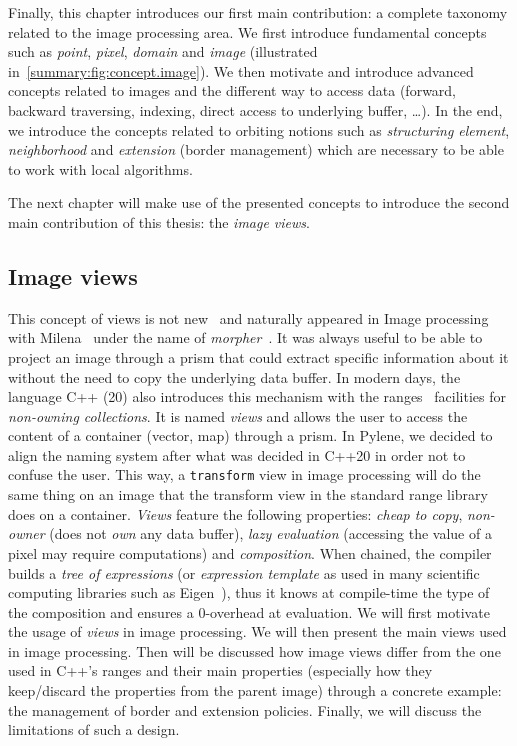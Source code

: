 Finally, this chapter introduces our first main contribution: a complete taxonomy related to the image processing area.
We first introduce fundamental concepts such as \emph{point}, \emph{pixel}, \emph{domain} and \emph{image} (illustrated
in~\cref{summary:fig:concept.image}). We then motivate and introduce advanced concepts related to images and the different way
to access data (forward, backward traversing, indexing, direct access to underlying buffer, \ldots). In the end, we
introduce the concepts related to orbiting notions such as \emph{structuring element}, \emph{neighborhood} and
\emph{extension} (border management) which are necessary to be able to work with local algorithms.

The next chapter will make use of the presented concepts to introduce the second main contribution of this thesis: the
\emph{image views}.


\subsection*{Image views}


This concept of views is not new~\parencite{novak.1997.reuse} and naturally appeared in Image processing with
Milena~\parencite{geraud.2012.ipolmeeting,levillain.2010.icip} under the name of
\emph{morpher}~\parencite{levillain.2009.ismm, geraud.2012.hdr}. It was always useful to be able to project an image
through a prism that could extract specific information about it without the need to copy the underlying data buffer. In
modern days, the language C++ (20) also introduces this mechanism with the ranges~\parencite{niebler.2014.ranges}
facilities for \emph{non-owning collections}. It is named \emph{views} and allows the user to access the content of a
container (vector, map) through a prism. In Pylene, we decided to align the naming system after what was decided in
C++20 in order not to confuse the user. This way, a \texttt{transform} view in image processing will do the same thing
on an image that the transform view in the standard range library does on a container. \emph{Views} feature the
following properties: \emph{cheap to copy}, \emph{non-owner} (does not \emph{own} any data buffer), \emph{lazy
  evaluation} (accessing the value of a pixel may require computations) and \emph{composition}. When chained, the compiler
builds a \emph{tree of expressions} (or \emph{expression template} as used in many scientific computing libraries such
as Eigen~\parencite{guennebaud.2010.eigen}), thus it knows at compile-time the type of the composition and ensures a
0-overhead at evaluation. We will first motivate the usage of \emph{views} in image processing. We will then present the
main views used in image processing. Then will be discussed how image views differ from the one used in C++'s ranges and
their main properties (especially how they keep/discard the properties from the parent image) through a concrete
example: the management of border and extension policies. Finally, we will discuss the limitations of such a design.

